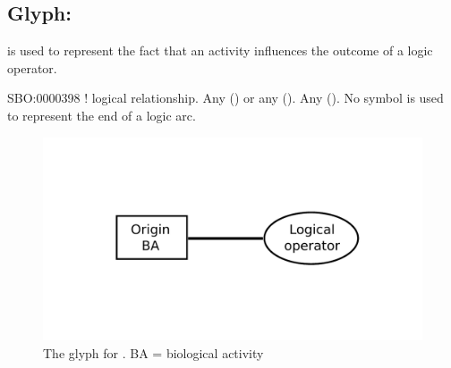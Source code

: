 
\subsection{Glyph:  }\label{sec:af:logicArc}

 is used to represent the fact that an activity influences the outcome of a logic operator.

\begin{glyphDescription}
 \glyphSboTerm SBO:0000398 ! logical relationship.
 \glyphOrigin Any  () or any  ().
 \glyphTarget Any  ().
 \glyphEndPoint No symbol is used to represent the end of a logic arc.
 \end{glyphDescription}

\begin{figure}[H]
  \centering
  \includegraphics[scale = 0.4]{images/build/logicArc.pdf}
  \caption{The \AF glyph for . BA = biological activity}
  \label{fig:logicArc}
\end{figure}
